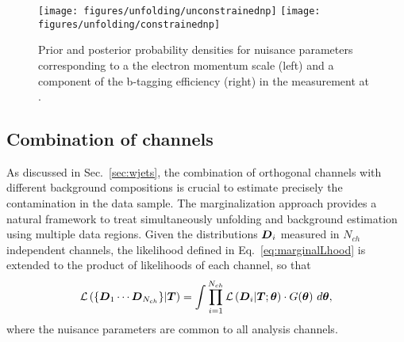 \begin{figure}[!htb]\centering
  \texttt{[image: figures/unfolding/unconstrainednp]}
  \texttt{[image: figures/unfolding/constrainednp]}
  \caption{Prior and posterior probability densities for nuisance parameters
    corresponding to a the electron momentum scale (left) and a
    component of the b-tagging efficiency (right) in the measurement
    at \eighttev{}.}
  \label{fig:nuispar}
\end{figure}

\subsection{Combination of channels}

As discussed in Sec.~\ref{sec:wjets}, the combination of
orthogonal channels with different background compositions is crucial
to estimate precisely the \wjets{} contamination in the \eighttev{}
data sample.
The marginalization approach provides a natural framework to treat
simultaneously unfolding and background estimation using
multiple data regions. Given the distributions $\boldsymbol{D}{}_i$ measured in $N_{ch}$
independent channels, the likelihood defined in Eq.~\ref{eq:marginalLhood}
is extended to the product of likelihoods of each channel, so that
\begin{equation}
  \mathcal{L}\left(\{\boldsymbol{D}{}_1\cdots{}\boldsymbol{D}{}_{N_{ch}}\}|\boldsymbol{T}{}\right)=
  \int
  \prod_{i=1}^{N_{ch}}\mathcal{L}\left(\boldsymbol{D}{}_i|\boldsymbol{T}{};\boldsymbol{\theta}{}\right) 
  \cdot{} G(\boldsymbol{\theta}{})
  ~d\boldsymbol{\theta}{},
\end{equation}
where the nuisance parameters are common to all analysis channels.

